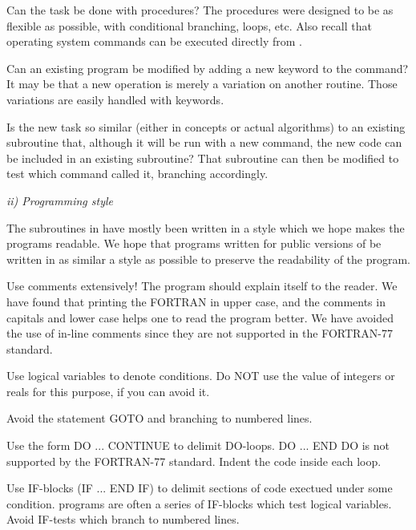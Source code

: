 \hang
{}Can the task be done with \V
procedures?  The procedures were designed to be as flexible as
possible, with conditional branching, loops, etc.  Also recall that
operating system commands can be executed directly from \Vns.

\hang
{}Can an existing program be modified by
adding a new keyword to the command?  It may be that a new operation
is merely a variation on another routine.  Those variations are easily
handled with keywords. 

\hang
{}Is the new task so similar (either in
concepts or actual algorithms) to an existing subroutine that,
although it will be run with a new command, the new code can be
included in an existing subroutine?  That subroutine can then be
modified to test which command called it, branching accordingly. 

\Sskip
\centerline {\it  ii) Programming style\rm}

\vskip 0.125in
	The subroutines in \V have mostly been written in a style which
we hope makes the programs readable.  
We hope that programs written for public versions of \V be
written in as similar a style as possible
to preserve the readability of the program. 

\hang
{}Use comments extensively!  The program
should explain itself to the reader.  We have found that printing the
FORTRAN in upper case, and the comments in capitals and lower case
helps one to read the program better. We have avoided the use of in-line
comments since they are not supported in the FORTRAN-77 standard.

\hang
{}Use logical variables to denote
conditions.  Do NOT use the value of integers or reals for this
purpose, if you can avoid it. 

\hang
{}Avoid the statement GOTO and branching
to numbered lines. 

\hang
{}Use the form DO ... CONTINUE
to delimit DO-loops.  DO ... END DO is not supported by the FORTRAN-77
standard. Indent the code inside each loop.

\hang
{}Use IF-blocks (IF ... END IF) to
delimit sections of code exectued under some condition.  \V programs
are often a series of IF-blocks which test logical variables. Avoid
IF-tests which branch to numbered lines. 

